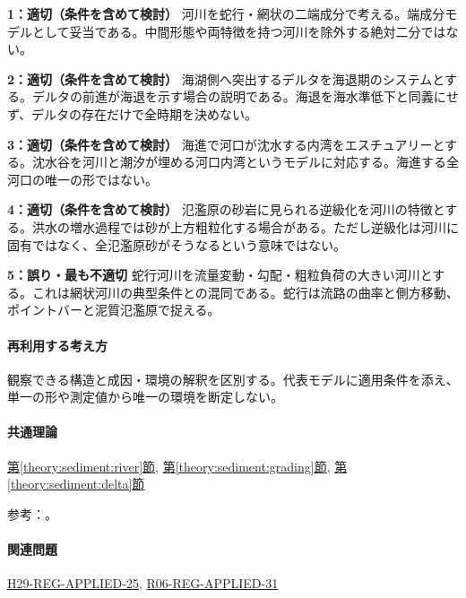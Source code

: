 \noindent\textbf{1：適切（条件を含めて検討）} 河川を蛇行・網状の二端成分で考える。端成分モデルとして妥当である。中間形態や両特徴を持つ河川を除外する絶対二分ではない。\par

\noindent\textbf{2：適切（条件を含めて検討）} 海湖側へ突出するデルタを海退期のシステムとする。デルタの前進が海退を示す場合の説明である。海退を海水準低下と同義にせず、デルタの存在だけで全時期を決めない。\par

\noindent\textbf{3：適切（条件を含めて検討）} 海進で河口が沈水する内湾をエスチュアリーとする。沈水谷を河川と潮汐が埋める河口内湾というモデルに対応する。海進する全河口の唯一の形ではない。\par

\noindent\textbf{4：適切（条件を含めて検討）} 氾濫原の砂岩に見られる逆級化を河川の特徴とする。洪水の増水過程では砂が上方粗粒化する場合がある。ただし逆級化は河川に固有ではなく、全氾濫原砂がそうなるという意味ではない。\par

\noindent\textbf{5：誤り・最も不適切} 蛇行河川を流量変動・勾配・粗粒負荷の大きい河川とする。これは網状河川の典型条件との混同である。蛇行は流路の曲率と側方移動、ポイントバーと泥質氾濫原で捉える。\par

\paragraph{再利用する考え方} 観察できる構造と成因・環境の解釈を区別する。代表モデルに適用条件を添え、単一の形や測定値から唯一の環境を断定しない。

\paragraph{共通理論} \hyperref[theory:sediment:river]{第\ref*{theory:sediment:river}節}, \hyperref[theory:sediment:grading]{第\ref*{theory:sediment:grading}節}, \hyperref[theory:sediment:delta]{第\ref*{theory:sediment:delta}節}

\par 参考：\cite{sed_mit_environment,sed_walther_oregon}。

\paragraph{関連問題} \hyperref[q:h29-reg-applied-25]{H29-REG-APPLIED-25}, \hyperref[q:r06-reg-applied-31]{R06-REG-APPLIED-31}

